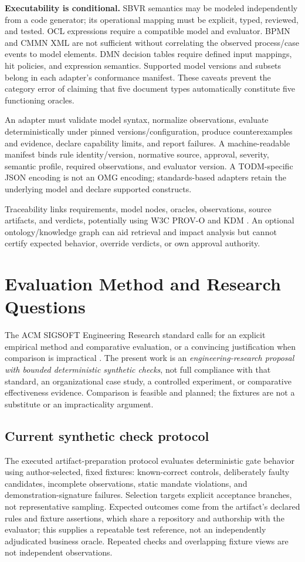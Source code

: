 \documentclass[11pt,a4paper]{article}
\begin{document}
\textbf{Executability is conditional.} SBVR semantics may be modeled independently from a code generator; its operational mapping must be explicit, typed, reviewed, and tested. OCL expressions require a compatible model and evaluator. BPMN and CMMN XML are not sufficient without correlating the observed process/case events to model elements. DMN decision tables require defined input mappings, hit policies, and expression semantics. Supported model versions and subsets belong in each adapter's conformance manifest. These caveats prevent the category error of claiming that five document types automatically constitute five functioning oracles.

An adapter must validate model syntax, normalize observations, evaluate deterministically under pinned versions/configuration, produce counterexamples and evidence, declare capability limits, and report failures. A machine-readable manifest binds rule identity/version, normative source, approval, severity, semantic profile, required observations, and evaluator version. A TODM-specific JSON encoding is not an OMG encoding; standards-based adapters retain the underlying model and declare supported constructs.

Traceability links requirements, model nodes, oracles, observations, source artifacts, and verdicts, potentially using W3C PROV-O \cite{w3c2013prov} and KDM \cite{omg2020kdm}. An optional ontology/knowledge graph can aid retrieval and impact analysis but cannot certify expected behavior, override verdicts, or own approval authority.

\section{Evaluation Method and Research Questions}\label{sec:validation}
The ACM SIGSOFT Engineering Research standard calls for an explicit empirical method and comparative evaluation, or a convincing justification when comparison is impractical \cite{sigsoftEngineering}. The present work is an \emph{engineering-research proposal with bounded deterministic synthetic checks}, not full compliance with that standard, an organizational case study, a controlled experiment, or comparative effectiveness evidence. Comparison is feasible and planned; the fixtures are not a substitute or an impracticality argument.

\subsection{Current synthetic check protocol}
The executed artifact-preparation protocol evaluates deterministic gate behavior using author-selected, fixed fixtures: known-correct controls, deliberately faulty candidates, incomplete observations, static mandate violations, and demonstration-signature failures. Selection targets explicit acceptance branches, not representative sampling. Expected outcomes come from the artifact's declared rules and fixture assertions, which share a repository and authorship with the evaluator; this supplies a repeatable test reference, not an independently adjudicated business oracle. Repeated checks and overlapping fixture views are not independent observations.
\end{document}
